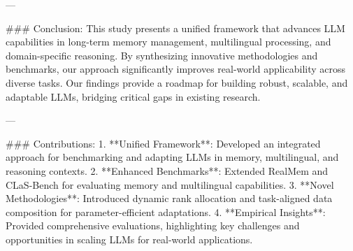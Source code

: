 ---

### Conclusion:
This study presents a unified framework that advances LLM capabilities in long-term memory management, multilingual processing, and domain-specific reasoning. By synthesizing innovative methodologies and benchmarks, our approach significantly improves real-world applicability across diverse tasks. Our findings provide a roadmap for building robust, scalable, and adaptable LLMs, bridging critical gaps in existing research.

---

### Contributions:
1. **Unified Framework**: Developed an integrated approach for benchmarking and adapting LLMs in memory, multilingual, and reasoning contexts.
2. **Enhanced Benchmarks**: Extended RealMem and CLaS-Bench for evaluating memory and multilingual capabilities.
3. **Novel Methodologies**: Introduced dynamic rank allocation and task-aligned data composition for parameter-efficient adaptations.
4. **Empirical Insights**: Provided comprehensive evaluations, highlighting key challenges and opportunities in scaling LLMs for real-world applications. 

